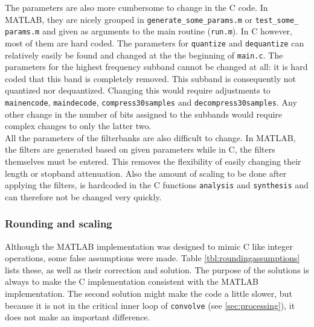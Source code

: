\documentclass[a4paper]{article}
\begin{document}
The parameters are also more cumbersome to change in the C code. In MATLAB, they are nicely grouped in \texttt{generate\_some\_params.m} or \texttt{test\_some\_ params.m} and given as arguments to the main routine (\texttt{run.m}). In C however, most of them are hard coded. The parameters for \texttt{quantize} and \texttt{dequantize} can relatively easily be found and changed at the the beginning of \texttt{main.c}. The parameters for the highest frequency subband cannot be changed at all: it is hard coded that this band is completely removed. This subband is consequently not quantized nor dequantized. Changing this would require adjustments to \texttt{mainencode}, \texttt{maindecode}, \texttt{compress30samples} and \texttt{decompress30samples}. Any other change in the number of bits assigned to the subbands would require complex changes to only the latter two.\\

All the parameters of the filterbanks are also difficult to change. In MATLAB, the filters are generated based on given parameters while in C, the filters themselves must be entered. This removes the flexibility of easily changing their length or stopband attenuation. Also the amount of scaling to be done after applying the filters, is hardcoded in the C functions \texttt{analysis} and \texttt{synthesis} and can therefore not be changed very quickly.

\subsubsection{Rounding and scaling}\label{sec:rounding}
Although the MATLAB implementation was designed to mimic C like integer operations, some false assumptions were made. Table \ref{tbl:roundingassumptions} lists these, as well as their correction and solution. The purpose of the solutions is always to make the C implementation consistent with the MATLAB implementation. The second solution might make the code a little slower, but because it is not in the critical inner loop of \texttt{convolve} (see \ref{sec:processing}), it does not make an important difference.\\
\end{document}
